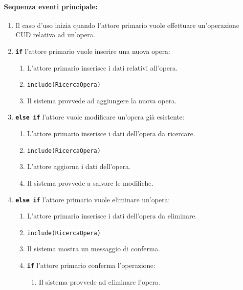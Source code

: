 \documentclass{article}
\begin{document}
	\paragraph{Sequenza eventi principale:}

		\begin{enumerate}[itemsep=8pt,parsep=0pt]
		
		\item 
		Il caso d'uso inizia quando l'attore primario vuole effettuare un’operazione CUD relativa ad un'opera.



		\item \texttt{\textbf{if}} l'attore primario vuole inserire una nuova opera:
			\begin{enumerate}	[leftmargin=28pt]
			\item L'attore primario inserisce i dati relativi all'opera.
			\item \texttt{{include(RicercaOpera)}}
			\item  Il sistema provvede ad aggiungere la nuova opera.
  			\end{enumerate}	



		\item \texttt{\textbf{else if}}  l’attore vuole modificare un'opera già esistente:
			\begin{enumerate}[leftmargin=28pt]
			    \item L'attore primario inserisce i dati dell'opera da ricercare.
				\item  \texttt{{include(RicercaOpera)}}
		        \item L'attore aggiorna i dati dell'opera.
		        \item  Il sistema provvede a salvare le modifiche.
  			\end{enumerate}	
  			
  		\item \texttt{\textbf{else if}} l'attore primario vuole eliminare un'opera:
			\begin{enumerate}	[leftmargin=28pt]
			\item L'attore primario inserisce i dati dell'opera da eliminare.
				\item \texttt{{include(RicercaOpera)}}
				\item  Il sistema mostra un messaggio di conferma.
				\item \texttt{\textbf{if}}  l'attore primario conferma l'operazione:
				    \begin{enumerate}	[leftmargin=28pt]
				    	   \item  Il sistema provvede ad eliminare l'opera.
				    \end{enumerate}
  			\end{enumerate}		
  			

	\end{enumerate}
	
\end{document}
